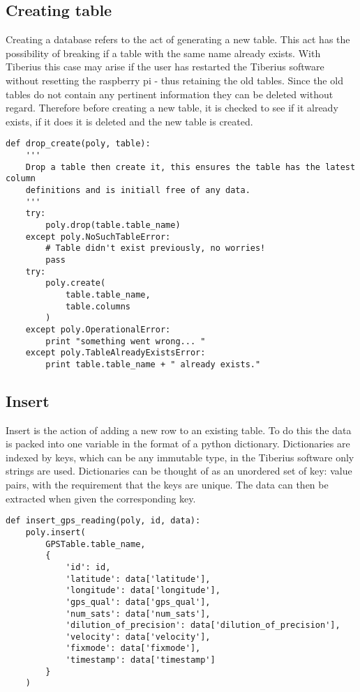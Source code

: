 \subsection{Creating table}
\label{create}
Creating a database refers to the act of generating a new table. This act has the possibility of breaking if a table with the same name already exists. With Tiberius this case may arise if the user has restarted the Tiberius software without resetting the raspberry pi - thus retaining the old tables. Since the old tables do not contain any pertinent information they can be deleted without regard. Therefore before creating a new table, it is checked to see if it already exists, if it does it is deleted and the new table is created. 

\begin{lstlisting}[style=custompython]
def drop_create(poly, table):
    '''
    Drop a table then create it, this ensures the table has the latest column
    definitions and is initiall free of any data.
    '''
    try:
        poly.drop(table.table_name)
    except poly.NoSuchTableError:
        # Table didn't exist previously, no worries!
        pass
    try:
        poly.create(
            table.table_name,
            table.columns
        )
    except poly.OperationalError:
        print "something went wrong... "
    except poly.TableAlreadyExistsError:
        print table.table_name + " already exists."
\end{lstlisting}


\subsection{Insert}
Insert is the action of adding a new row to an existing table. 
To do this the data is packed into one variable in the format of a python dictionary. Dictionaries are indexed by keys, which can be any immutable type, in the Tiberius software only strings are used. Dictionaries can be thought of as an unordered set of key: value pairs, with the requirement that the keys are unique. The data can then be extracted when given the corresponding key.

\begin{lstlisting}[style=custompython]
def insert_gps_reading(poly, id, data):
    poly.insert(
        GPSTable.table_name,
        {
            'id': id,
            'latitude': data['latitude'],
            'longitude': data['longitude'],
            'gps_qual': data['gps_qual'],
            'num_sats': data['num_sats'],
            'dilution_of_precision': data['dilution_of_precision'],
            'velocity': data['velocity'],
            'fixmode': data['fixmode'],
            'timestamp': data['timestamp']
        }
    )
\end{lstlisting}

